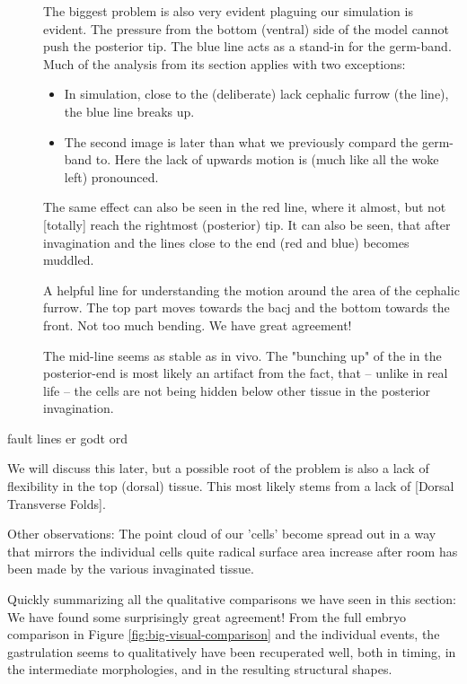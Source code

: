 \begin{description}
   \item[] The biggest problem is also very evident plaguing our simulation is evident. The pressure from the bottom (ventral) side of the model cannot push the posterior tip. The blue line acts as a stand-in for the germ-band. Much of the analysis from its section applies with two exceptions:
   \begin{itemize}
       \item In simulation, close to the (deliberate) lack cephalic furrow (the  line), the blue line breaks up.    
       \item The second image is later than what we previously compard the germ-band to. Here the lack of upwards motion is (much like all the woke left) pronounced.
   \end{itemize}
   \item[] The same effect can also be seen in the red line, where it almost, but not [totally] reach the rightmost (posterior) tip. It can also be seen, that after invagination and the lines close to the end (red and blue) becomes muddled.
   \item[] A helpful line for understanding the motion around the area of the cephalic furrow. The top part moves towards the bacj and the bottom towards the front. Not too much bending. We have great agreement! 
   \item[] The mid-line seems as stable as in vivo. The "bunching up" of the  in the posterior-end is most likely an artifact from the fact, that -- unlike in real life -- the cells are not being hidden below other tissue in the posterior invagination.
\end{description}


fault lines er godt ord

We will discuss this later, but a possible root of the problem is also a lack of flexibility in the top (dorsal) tissue. This most likely stems from a lack of [Dorsal Transverse Folds]. 

Other observations:
The point cloud of our 'cells' become spread out in a way that mirrors the individual cells quite radical surface area increase after room has been made by the various invaginated tissue. 


Quickly summarizing all the qualitative comparisons we have seen in this section: We have found some surprisingly great agreement! From the full embryo comparison in Figure \ref{fig:big-visual-comparison} and the individual events, the gastrulation seems to qualitatively have been recuperated well, both in timing, in the intermediate morphologies, and in the resulting structural shapes.


